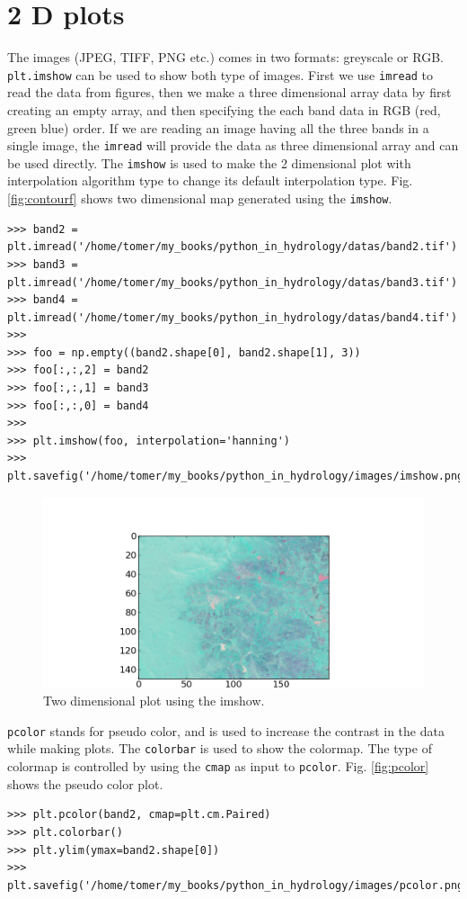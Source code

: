 \documentclass[10pt]{book}
\begin{document}
{\section{2 D plots}
The images (JPEG, TIFF, PNG etc.) comes in two formats: greyscale or RGB. \verb"plt.imshow" can be used to show both type of images. First we use \verb"imread" to read the data from figures, then we make a three dimensional array data by first creating an empty array, and then specifying the each band data in RGB (red, green blue) order. If we are reading an image having all the three bands in a single image, the \verb"imread" will provide the data as three dimensional array and can be used directly. The \verb"imshow" is used to make the 2 dimensional plot with interpolation algorithm type to change its default interpolation type. Fig. \ref{fig:contourf} shows two dimensional map generated using the \verb"imshow". 
\beforeverb
\begin{verbatim}
>>> band2 = plt.imread('/home/tomer/my_books/python_in_hydrology/datas/band2.tif')
>>> band3 = plt.imread('/home/tomer/my_books/python_in_hydrology/datas/band3.tif')
>>> band4 = plt.imread('/home/tomer/my_books/python_in_hydrology/datas/band4.tif')
>>> 
>>> foo = np.empty((band2.shape[0], band2.shape[1], 3))
>>> foo[:,:,2] = band2
>>> foo[:,:,1] = band3
>>> foo[:,:,0] = band4
>>> 
>>> plt.imshow(foo, interpolation='hanning')
>>> plt.savefig('/home/tomer/my_books/python_in_hydrology/images/imshow.png')
\end{verbatim}
\afterverb
{}

\beforefig
\begin{figure}[h!]
  \centering
    \includegraphics[scale=0.5]{images/imshow.png}
  \caption{Two dimensional plot using the imshow.}
   \label{fig:imshow}
\end{figure}
\afterfig

\verb"pcolor" stands for pseudo color, and is used to increase the contrast in the data while making plots. The \verb"colorbar" is used to show the colormap. The type of colormap is controlled by using the \verb"cmap" as input to \verb"pcolor". Fig. \ref{fig:pcolor} shows the pseudo color plot. 
\beforeverb \begin{verbatim}
>>> plt.pcolor(band2, cmap=plt.cm.Paired)
>>> plt.colorbar()
>>> plt.ylim(ymax=band2.shape[0])
>>> plt.savefig('/home/tomer/my_books/python_in_hydrology/images/pcolor.png')
\end{verbatim} \afterverb
{}

}
\end{document}
